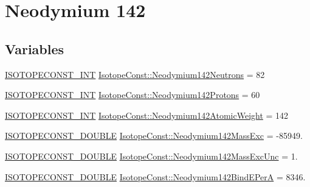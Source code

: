 \hypertarget{group___isotope_const-_neodymium-_nd142}{}\section{Neodymium 142}
\label{group___isotope_const-_neodymium-_nd142}
\subsection*{Variables}
\begin{DoxyCompactItemize}
\item 
\mbox{\hyperlink{group___isotope_const-_macros_ga5f18360b3e99483a35c32d789e62621c}{I\+S\+O\+T\+O\+P\+E\+C\+O\+N\+S\+T\+\_\+\+I\+NT}} \mbox{\hyperlink{group___isotope_const-_neodymium-_nd142_gabb66502ec6cfa59908150af96fa2e73a}{Isotope\+Const\+::\+Neodymium142\+Neutrons}} = 82
\item 
\mbox{\hyperlink{group___isotope_const-_macros_ga5f18360b3e99483a35c32d789e62621c}{I\+S\+O\+T\+O\+P\+E\+C\+O\+N\+S\+T\+\_\+\+I\+NT}} \mbox{\hyperlink{group___isotope_const-_neodymium-_nd142_gaee8b478665f4b3d8fd9a8f3631db0096}{Isotope\+Const\+::\+Neodymium142\+Protons}} = 60
\item 
\mbox{\hyperlink{group___isotope_const-_macros_ga5f18360b3e99483a35c32d789e62621c}{I\+S\+O\+T\+O\+P\+E\+C\+O\+N\+S\+T\+\_\+\+I\+NT}} \mbox{\hyperlink{group___isotope_const-_neodymium-_nd142_ga2afd39f8d48a1def3c2942a07a6b0362}{Isotope\+Const\+::\+Neodymium142\+Atomic\+Weight}} = 142
\item 
\mbox{\hyperlink{group___isotope_const-_macros_ga8f45a7272ce02c0b4c65c44636ed719a}{I\+S\+O\+T\+O\+P\+E\+C\+O\+N\+S\+T\+\_\+\+D\+O\+U\+B\+LE}} \mbox{\hyperlink{group___isotope_const-_neodymium-_nd142_ga0eb3746546d08c7599bfdb5d2bfabcd9}{Isotope\+Const\+::\+Neodymium142\+Mass\+Exc}} = -\/85949.
\item 
\mbox{\hyperlink{group___isotope_const-_macros_ga8f45a7272ce02c0b4c65c44636ed719a}{I\+S\+O\+T\+O\+P\+E\+C\+O\+N\+S\+T\+\_\+\+D\+O\+U\+B\+LE}} \mbox{\hyperlink{group___isotope_const-_neodymium-_nd142_ga3b17878ddb1774cfe2a5e395c06bcb11}{Isotope\+Const\+::\+Neodymium142\+Mass\+Exc\+Unc}} = 1.
\item 
\mbox{\hyperlink{group___isotope_const-_macros_ga8f45a7272ce02c0b4c65c44636ed719a}{I\+S\+O\+T\+O\+P\+E\+C\+O\+N\+S\+T\+\_\+\+D\+O\+U\+B\+LE}} \mbox{\hyperlink{group___isotope_const-_neodymium-_nd142_ga6bb7ed344f50349c8ed1c4ceb6aecd5a}{Isotope\+Const\+::\+Neodymium142\+Bind\+E\+PerA}} = 8346.
\item 

\end{DoxyCompactItemize}
